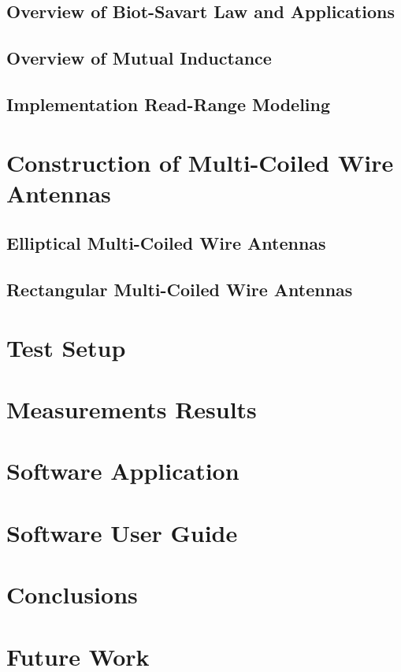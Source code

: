 \documentclass[12pt,onecolumn]{report}
\begin{document}
        \subsection{Overview of Biot-Savart Law and Applications}
        \subsection{Overview of Mutual Inductance}
        \subsection{Implementation Read-Range Modeling} 
    \section{Construction of Multi-Coiled Wire Antennas}
        \subsection{Elliptical Multi-Coiled Wire Antennas}
        \subsection{Rectangular Multi-Coiled Wire Antennas}
    \section{Test Setup}
    \section{Measurements Results}
    \section{Software Application}
    \section{Software User Guide} 
    \section{Conclusions}
    \section{Future Work}
    
\end{document}
